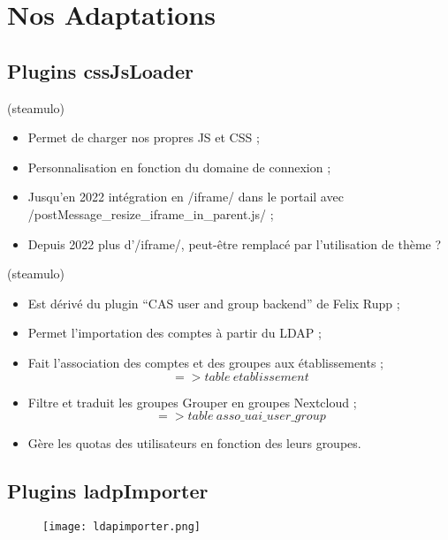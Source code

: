 \section{Nos Adaptations}
\subsection{Plugins cssJsLoader}
\begin{frame}[fragile]{\sub}{(steamulo)}
\begin{itemize}
\item Permet de charger nos propres JS et CSS ;
\item Personnalisation en fonction du domaine de connexion ;
\item Jusqu'en 2022 intégration en \code/iframe/ dans le portail avec \code/postMessage_resize_iframe_in_parent.js/ ;
\item Depuis 2022 plus d'\code/iframe/, peut-être remplacé par l'utilisation de thème ? 
\end{itemize}
\end{frame} 


\begin{frame}{\sub}{(steamulo)} %
\begin{itemize}
\item Est dérivé du plugin ``CAS user and group backend'' de Felix Rupp ;
\item Permet l'importation des comptes à partir du LDAP ;
\item Fait l'association des comptes et des groupes aux établissements ;
		{\small $$ => table\ etablissement $$} 
\item Filtre et traduit les groupes Grouper en groupes Nextcloud ;
		{\small $$ => table\ asso\_uai\_user\_group $$ } 
\item Gère les quotas des utilisateurs en fonction des leurs groupes.
\end{itemize}
\end{frame}

\subsection{Plugins ladpImporter}
\begin{frame}{\sub} %
\begin{figure}
\texttt{[image: ldapimporter.png]}
\end{figure}
\end{frame}


